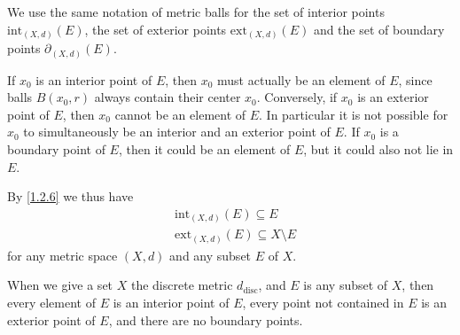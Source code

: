 \begin{note}
  We use the same notation of metric balls for the set of interior points \(\text{int}_{(X, d)}(E)\), the set of exterior points \(\text{ext}_{(X, d)}(E)\) and the set of boundary points \(\partial_{(X, d)}(E)\).
\end{note}

\begin{remark}\label{1.2.6}
  If \(x_0\) is an interior point of \(E\), then \(x_0\) must actually be an element of \(E\), since balls \(B(x_0, r)\) always contain their center \(x_0\).
  Conversely, if \(x_0\) is an exterior point of \(E\), then \(x_0\) cannot be an element of \(E\).
  In particular it is not possible for \(x_0\) to simultaneously be an interior and an exterior point of \(E\).
  If \(x_0\) is a boundary point of \(E\), then it could be an element of \(E\), but it could also not lie in \(E\).
\end{remark}

\begin{note}
  By \cref{1.2.6} we thus have
  \begin{align*}
     & \text{int}_{(X, d)}(E) \subseteq E             \\
     & \text{ext}_{(X, d)}(E) \subseteq X \setminus E
  \end{align*}
  for any metric space \((X, d)\) and any subset \(E\) of \(X\).
\end{note}

\setcounter{theorem}{7}
\begin{example}\label{1.2.8}
  When we give a set \(X\) the discrete metric \(d_{\text{disc}}\), and \(E\) is any subset of \(X\), then every element of \(E\) is an interior point of \(E\), every point not contained in \(E\) is an exterior point of \(E\), and there are no boundary points.
\end{example}

